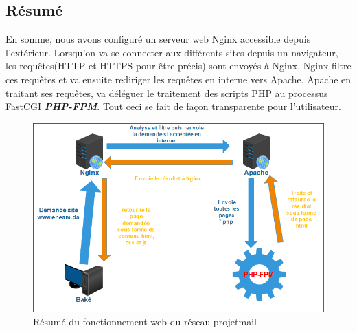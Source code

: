 \documentclass[a4paper,12pt,french]{report} %
\begin{document}
\subsection*{Résumé}
En somme, nous avons configuré un serveur web Nginx accessible depuis l'extérieur. Lorsqu'on va se connecter aux différents sites depuis un navigateur, les requêtes(HTTP et HTTPS pour être précis) sont envoyés à Nginx. Nginx filtre  ces requêtes et va ensuite rediriger les requêtes en interne vers Apache. Apache en traitant ses requêtes, va déléguer le traitement des scripts PHP au processus FastCGI \emph{\textbf{PHP-FPM}}. Tout ceci se fait de façon transparente pour l'utilisateur.
\begin{figure}[H]
	\centering
	\includegraphics[scale=0.7]{figure/resume-fonctionnement-web-eneam.png}
	\caption{Résumé du fonctionnement web du réseau projetmail}	
\end{figure}
\end{document}
